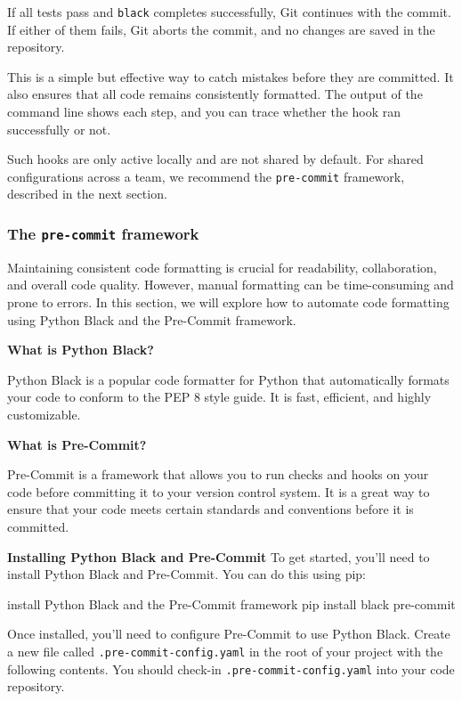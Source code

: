 If all tests pass and \texttt{black} completes successfully, Git continues with the commit. If either of them fails, Git aborts the commit, and no changes are saved in the repository.

This is a simple but effective way to catch mistakes before they are committed. It also ensures that all code remains consistently formatted. The output of the command line shows each step, and you can trace whether the hook ran successfully or not.

Such hooks are only active locally and are not shared by default. For shared configurations across a team, we recommend the \texttt{pre-commit} framework, described in the next section.

\subsubsection{The \texttt{pre-commit} framework}
\label{sec:pre-commit}
Maintaining consistent code formatting is crucial for readability, collaboration, and overall code quality. However, manual formatting can be time-consuming and prone to errors. In this section, we will explore how to automate code formatting using Python Black and the Pre-Commit framework.

\textbf{What is Python Black?}

Python Black is a popular code formatter for Python that automatically formats your code to conform to the PEP 8 style guide. It is fast, efficient, and highly customizable.

\textbf{What is Pre-Commit?}

Pre-Commit is a framework that allows you to run checks and hooks on your code before committing it to your version control system. It is a great way to ensure that your code meets certain standards and conventions before it is committed.

\textbf{Installing Python Black and Pre-Commit}
To get started, you'll need to install Python Black and Pre-Commit. You can do this using pip:

\begin{codeonly}{install Python Black and the Pre-Commit framework}
pip install black pre-commit
\end{codeonly}

Once installed, you'll need to configure Pre-Commit to use Python Black. Create a new file called \texttt{.pre-commit-config.yaml} in the root of your project with the following contents. You should check-in \texttt{.pre-commit-config.yaml} into your code repository.

